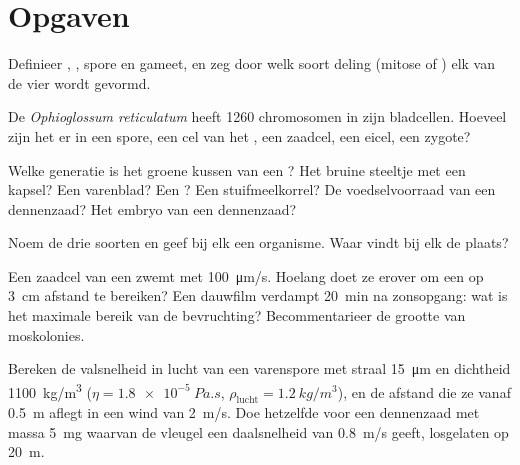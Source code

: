 \section{Opgaven}

\begin{exercise}[$\star$]\label{exo:b2:plant-life-cycles:1}
Definieer , , spore en gameet, en zeg door welk soort
deling (mitose of ) elk van de vier wordt gevormd.
\end{exercise}

\begin{exercise}[$\star$]\label{exo:b2:plant-life-cycles:2}
De  \emph{Ophioglossum reticulatum} heeft \num{1260}
chromosomen in zijn bladcellen. Hoeveel zijn het er in een spore, een
cel van het , een zaadcel, een eicel, een zygote?
\end{exercise}

\begin{exercise}[$\star$]\label{exo:b2:plant-life-cycles:3}
Welke generatie is het groene kussen van een ? Het bruine steeltje
met een kapsel? Een varenblad? Een ? Een stuifmeelkorrel? De
voedselvoorraad van een dennenzaad? Het embryo van een dennenzaad?
\end{exercise}

\begin{exercise}[$\star$]\label{exo:b2:plant-life-cycles:4}
Noem de drie soorten  en geef bij elk een organisme.
Waar vindt bij elk de  plaats?
\end{exercise}

\begin{exercise}[$\star\star$]\label{exo:b2:plant-life-cycles:5}
Een zaadcel van een  zwemt met \qty{100}{\micro m/s}. Hoelang doet ze
erover om een  op \qty{3}{cm} afstand te bereiken? Een
dauwfilm verdampt \qty{20}{min} na zonsopgang: wat is het maximale bereik
van de bevruchting? Becommentarieer de grootte van moskolonies.
\end{exercise}

\begin{exercise}[$\star\star$]\label{exo:b2:plant-life-cycles:6}
Bereken de valsnelheid in lucht van een varenspore met straal
\qty{15}{\micro m} en dichtheid \qty{1100}{kg/m^3} ($\eta =
\qty{1.8e-5}{Pa.s}$, $\rho_{\text{lucht}} = \qty{1.2}{kg/m^3}$), en
de afstand die ze vanaf \qty{0.5}{m} aflegt in een wind van \qty{2}{m/s}.
Doe hetzelfde voor een dennenzaad met massa \qty{5}{mg} waarvan de vleugel
een daalsnelheid van \qty{0.8}{m/s} geeft, losgelaten op \qty{20}{m}.
\end{exercise}

